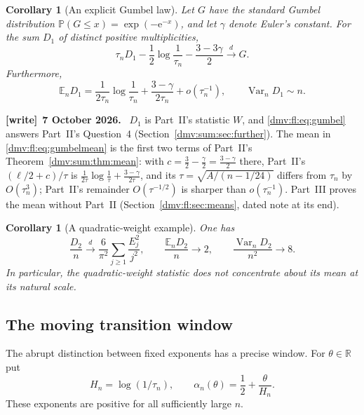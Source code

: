 \documentclass[11pt,letterpaper]{article}
\numberwithin{equation}{section}
\newtheorem{corollary}[theorem]{Corollary}
\theoremstyle{definition}\newtheorem{definition}[theorem]{Definition}
\theoremstyle{remark}\newtheorem{remark}[theorem]{Remark}
\newcommand{\E}{\mathbb E}
\newcommand{\ee}{\mathrm e}
\newenvironment{writenote}[1][]{\par\smallskip\begingroup\small
 \noindent\textbf{[write]}\if\relax\detokenize{#1}\relax\else~\textbf{#1.}\fi\ }%
 {\par\endgroup\smallskip}
\newcommand{\Pp}{\mathbb P}
\newcommand{\R}{\mathbb R}
\newcommand{\dto}{\xrightarrow{\ d\ }}
\DeclareMathOperator{\Var}{Var}
\begin{document}
\begin{corollary}[An explicit Gumbel law]\label{dmv:fl:cor:gumbel}
Let $G$ have the standard Gumbel distribution
$\Pp(G\le x)=\exp(-\ee^{-x})$, and let $\gamma$ denote Euler's constant.
For the sum $D_1$ of distinct positive multiplicities,
\begin{equation}\label{dmv:fl:eq:gumbel}
 \tau_nD_1-\frac12\log\frac1{\tau_n}
       -\frac{3-3\gamma}{2}\dto G.
\end{equation}
Furthermore,
\begin{equation}\label{dmv:fl:eq:gumbelmean}
 \E_nD_1=\frac1{2\tau_n}\log\frac1{\tau_n}
       +\frac{3-\gamma}{2\tau_n}+o(\tau_n^{-1}),
 \qquad \Var_nD_1\sim n.
\end{equation}
\end{corollary}
\begin{writenote}[7 October 2026]
$D_1$ is Part~II's statistic $W$, and \eqref{dmv:fl:eq:gumbel} answers
Part~II's Question~4 (Section~\ref{dmv:sum:sec:further}). The mean
in \eqref{dmv:fl:eq:gumbelmean} is the first two terms of Part~II's
Theorem~\ref{dmv:sum:thm:mean}: with $c=\tfrac32-\tfrac\gamma2=\tfrac{3-\gamma}2$
there, Part~II's $(\ell/2+c)/\tau$ is $\frac1{2\tau}\log\frac1\tau+\frac{3-\gamma}{2\tau}$,
and its $\tau=\sqrt{A/(n-1/24)}$ differs from $\tau_n$ by
$O(\tau_n^3)$; Part~II's remainder $O(\tau^{-1/2})$ is sharper than
$o(\tau_n^{-1})$. Part~III proves the mean without Part~II
(Section~\ref{dmv:fl:sec:means}, dated note at its end).
\end{writenote}

\begin{corollary}[A quadratic-weight example]\label{dmv:fl:cor:quadratic}
One has
\[
 \frac{D_2}{n}\dto\frac6{\pi^2}\sum_{j\ge1}\frac{E_j^2}{j^2},
 \qquad\frac{\E_nD_2}{n}\longrightarrow2,
 \qquad\frac{\Var_nD_2}{n^2}\longrightarrow8.
\]
In particular, the quadratic-weight statistic does not concentrate about
its mean at its natural scale.
\end{corollary}

\subsection{The moving transition window}
The abrupt distinction between fixed exponents has a precise window.
For $\theta\in\R$ put
\[
 H_n=\log(1/\tau_n),\qquad
 \alpha_n(\theta)=\frac12+\frac\theta{H_n}.
\]
These exponents are positive for all sufficiently large $n$.
\end{document}
